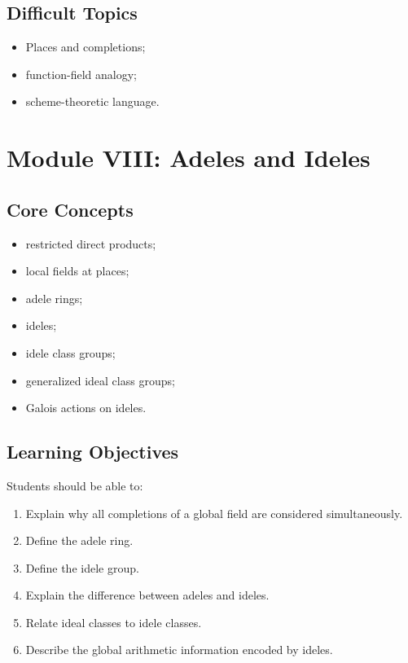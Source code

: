 \documentclass[11pt,a4paper]{article}
\begin{document}
\subsection{Difficult Topics}

\begin{itemize}
    \item Places and completions;
    \item function-field analogy;
    \item scheme-theoretic language.
\end{itemize}

\section{Module VIII: Adeles and Ideles}

\subsection{Core Concepts}

\begin{itemize}
    \item restricted direct products;
    \item local fields at places;
    \item adele rings;
    \item ideles;
    \item idele class groups;
    \item generalized ideal class groups;
    \item Galois actions on ideles.
\end{itemize}

\subsection{Learning Objectives}

Students should be able to:

\begin{enumerate}
    \item Explain why all completions of a global field are considered
    simultaneously.
    \item Define the adele ring.
    \item Define the idele group.
    \item Explain the difference between adeles and ideles.
    \item Relate ideal classes to idele classes.
    \item Describe the global arithmetic information encoded by ideles.
\end{enumerate}
\end{document}
